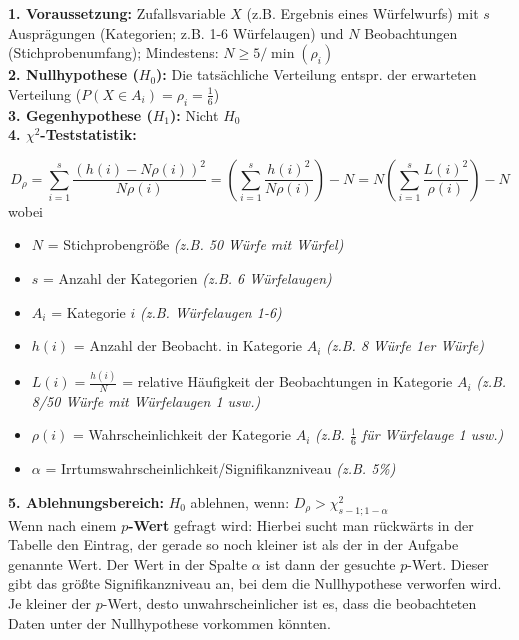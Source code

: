 \textbf{1. Voraussetzung:} Zufallsvariable \(X\) (z.B. Ergebnis eines Würfelwurfs) mit \(s\) Ausprägungen 
(Kategorien; z.B. 1-6 Würfelaugen) und \(N\) Beobachtungen (Stichprobenumfang); Mindestens: \(N\geq 5 / \min(\rho_i)\)\\

\textbf{2. Nullhypothese (\(H_0\)):} Die tatsächliche Verteilung entspr. der erwarteten Verteilung (\(P(X \in A_i)=\rho_i=\frac{1}{6}\))\\

\textbf{3. Gegenhypothese (\(H_1\)):} Nicht \(H_0\)\\

\textbf{4. \(\chi^2\)-Teststatistik:}

\begin{equation*}
    D_{\rho} = \sum_{i=1}^{s}\frac{(h(i)-N\rho(i))^2}{N\rho(i)}=\left(\sum_{i=1}^{s}\frac{h(i)^2}{N\rho(i)}\right)-N=N\left(\sum_{i=1}^{s}\frac{L(i)^2}{\rho(i)}\right) - N
\end{equation*}
wobei
\begin{itemize}
    \item \(N\) = Stichprobengröße \emph{(z.B. 50 Würfe mit Würfel)}
    \item \(s\) = Anzahl der Kategorien \emph{(z.B. 6 Würfelaugen)}
    \item \(A_i\) = Kategorie \(i\) \emph{(z.B. Würfelaugen 1-6)}
    \item \(h(i)\) = Anzahl der Beobacht. in Kategorie \(A_i\) \emph{(z.B. 8 Würfe 1er Würfe)}
    \item \(L(i)=\frac{h(i)}{N}\) = relative Häufigkeit der Beobachtungen in Kategorie \(A_i\) \emph{(z.B. 8/50 Würfe mit Würfelaugen 1 usw.)}
    \item \(\rho(i)\) = Wahrscheinlichkeit der Kategorie \(A_i\) \emph{(z.B. \(\frac{1}{6}\) für Würfelauge 1 usw.)}
    \item \(\alpha\) = Irrtumswahrscheinlichkeit/Signifikanzniveau \emph{(z.B. 5\%)}
\end{itemize}

\textbf{5. Ablehnungsbereich:} \(H_0\) ablehnen, wenn:  \(D_{\rho} > \chi^2_{s-1;1-\alpha}\)\\


Wenn nach einem \textbf{\(p\)-Wert} gefragt wird: Hierbei sucht man rückwärts in der Tabelle den Eintrag, der gerade so noch kleiner ist als der in der Aufgabe genannte Wert. Der Wert in der Spalte \(\alpha\) ist dann der gesuchte \(p\)-Wert. Dieser gibt das größte Signifikanzniveau an, bei dem die Nullhypothese verworfen wird. Je kleiner der \(p\)-Wert, desto unwahrscheinlicher ist es, dass die beobachteten Daten unter der Nullhypothese vorkommen könnten.\\

